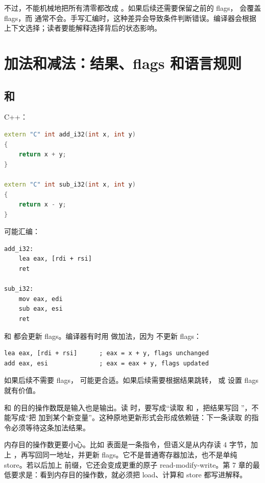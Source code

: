 不过，不能机械地把所有清零都改成 。如果后续还需要保留之前的 flags， 会覆盖 flags，而  通常不会。手写汇编时，这种差异会导致条件判断错误。编译器会根据上下文选择；读者要能解释选择背后的状态影响。

\section{加法和减法：结果、flags 和语言规则}

\subsection{ 和 }

C++：

\begin{lstlisting}[language=C++]
extern "C" int add_i32(int x, int y)
{
    return x + y;
}

extern "C" int sub_i32(int x, int y)
{
    return x - y;
}
\end{lstlisting}

可能汇编：

\begin{lstlisting}
add_i32:
    lea eax, [rdi + rsi]
    ret

sub_i32:
    mov eax, edi
    sub eax, esi
    ret
\end{lstlisting}

 和  都会更新 flags。编译器有时用  做加法，因为  不更新 flags：

\begin{lstlisting}
lea eax, [rdi + rsi]      ; eax = x + y, flags unchanged
add eax, esi              ; eax = eax + y, flags updated
\end{lstlisting}

如果后续不需要 flags， 可能更合适。如果后续需要根据结果跳转， 或  设置 flags 就有价值。

 和  的目的操作数既是输入也是输出。读  时，要写成“读取  和 ，把结果写回 ”，不能写成“把  加到某个新变量”。这种原地更新形式会形成依赖链：下一条读取  的指令必须等待这条加法结果。

内存目的操作数更要小心。比如  表面是一条指令，但语义是从内存读 4 字节，加上 ，再写回同一地址，并更新 flags。它不是普通寄存器加法，也不是单纯 store。若以后加上  前缀，它还会变成更重的原子 read-modify-write。第 7 章的最低要求是：看到内存目的操作数，就必须把 load、计算和 store 都写进解释。

